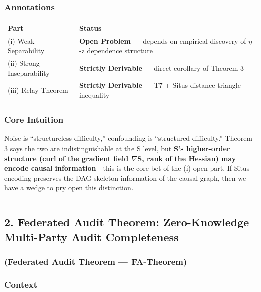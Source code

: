 \documentclass[
  12pt,
]{article}
\begin{document}
\subsubsection{Annotations}\label{cd-annotations}

\begin{longtable}[]{@{}ll@{}}
\toprule\noalign{}
Part & Status \\
\midrule\noalign{}
\endhead
\bottomrule\noalign{}
\endlastfoot
(i) Weak Separability & \textbf{Open Problem} --- depends on empirical discovery of $\eta$-z dependence structure \\
(ii) Strong Inseparability & \textbf{Strictly Derivable} --- direct corollary of Theorem 3 \\
(iii) Relay Theorem & \textbf{Strictly Derivable} --- T7 + Situs distance triangle inequality \\
\end{longtable}

\subsubsection{Core Intuition}\label{core-intuition-cd}

Noise is ``structureless difficulty,'' confounding is ``structured difficulty.'' Theorem 3 says the two are indistinguishable at the S level, but \textbf{S's higher-order structure (curl of the gradient field $\nabla$S, rank of the Hessian) may encode causal information}---this is the core bet of the (i) open part. If Situs encoding preserves the DAG skeleton information of the causal graph, then we have a wedge to pry open this distinction.

\begin{center}\rule{0.5\linewidth}{0.5pt}\end{center}

\subsection{2. Federated Audit Theorem: Zero-Knowledge Multi-Party Audit Completeness}\label{federated-audit-theorem}

\subsubsection{(Federated Audit Theorem --- FA-Theorem)}\label{fa-theorem-next}

\subsubsection{Context}\label{context-fa}
\end{document}
